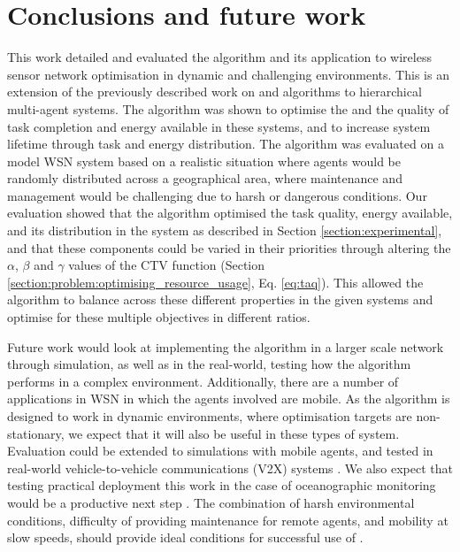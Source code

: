 \section{Conclusions and future work}
\label{section:conclusions}

This work detailed and evaluated the \acronymWSNOptimisation{}{} algorithm and its application to wireless sensor network optimisation in dynamic and challenging environments. This is an extension of the previously described work on \acronymATARIA{}{} and \acronymMGRAO{}{} algorithms \citep{creech2021dynamic,creech2021resource} to hierarchical multi-agent systems. The algorithm was shown to optimise the and the quality of task completion and energy available in these systems, and to increase system lifetime through task and energy distribution. The algorithm was evaluated on a model WSN system based on a realistic situation where agents would be randomly distributed across a geographical area, where maintenance and management would be challenging due to harsh or dangerous conditions.  Our evaluation showed that the \acronymWSNOptimisation{}{} algorithm optimised the task quality, energy available, and its distribution in the system as described in Section \ref{section:experimental}, and that these components could be varied in their priorities through altering the $\alpha$, $\beta$ and $\gamma$ values of the CTV function (Section \ref{section:problem:optimising_resource_usage}, Eq. \ref{eq:taq}). This allowed the algorithm to balance across these different properties in the given systems and optimise for these multiple objectives in different ratios. 

Future work would look at implementing the algorithm in a larger scale network through simulation, as well as in the real-world, testing how the algorithm performs in a complex environment. Additionally, there are a number of applications in WSN in which the agents involved are mobile. As the \acronymWSNOptimisation{}{} algorithm is designed to work in dynamic environments, where optimisation targets are non-stationary, we expect that it will also be useful in these types of system. Evaluation could be extended to simulations with mobile agents, and tested in real-world vehicle-to-vehicle communications (V2X) systems \citep{Gupta2017, Tong2019}. We also expect that testing practical deployment this work in the case of oceanographic monitoring would be a productive next step \citep{Albaladejo2010a}. The combination of harsh environmental conditions, difficulty of providing maintenance for remote agents, and mobility at slow speeds, should provide ideal conditions for successful use of \acronymWSNOptimisation{}{}.


  